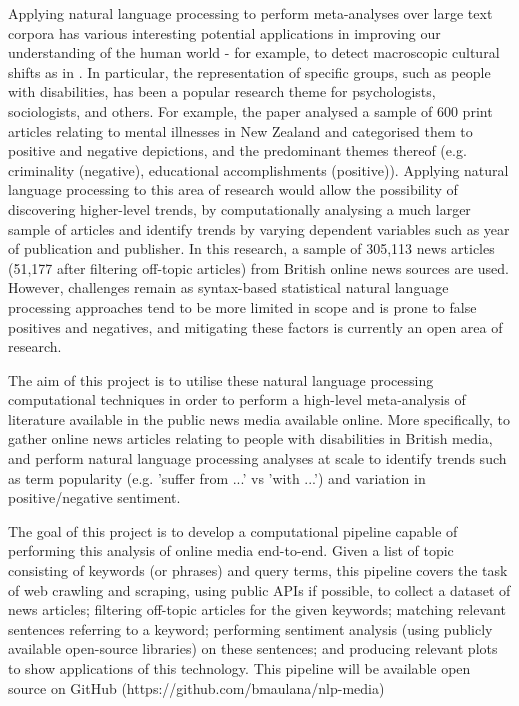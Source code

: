 \documentclass{report}
\begin{document}
Applying natural language processing to perform meta-analyses over large text corpora has various interesting potential applications in improving our understanding of the human world - for example, to detect macroscopic cultural shifts as in \cite{Content analysis of 150 years of British periodicals}.
In particular, the representation of specific groups, such as people with disabilities, has been a popular research theme for psychologists, sociologists, and others.
For example, the paper \cite{Depictions of Mental Illness in Print Media} analysed a sample of 600 print articles relating to mental illnesses in New Zealand and categorised them to positive and negative depictions, and the predominant themes thereof (e.g. criminality (negative), educational accomplishments (positive)).
Applying natural language processing to this area of research would allow the possibility of discovering higher-level trends, by computationally analysing a much larger sample of articles and identify trends by varying dependent variables such as year of publication and publisher.
In this research, a sample of 305,113 news articles (51,177 after filtering off-topic articles) from British online news sources are used.
However, challenges remain as syntax-based statistical natural language processing approaches tend to be more limited in scope and is prone to false positives and negatives, and mitigating these factors is currently an open area of research.

The aim of this project is to utilise these natural language processing computational techniques in order to perform a high-level meta-analysis of literature available in the public news media available online.
More specifically, to gather online news articles relating to people with disabilities in British media, and perform natural language processing analyses at scale to identify trends such as term popularity (e.g. 'suffer from ...' vs 'with ...') and variation in positive/negative sentiment.

The goal of this project is to develop a computational pipeline capable of performing this analysis of online media end-to-end.
Given a list of topic consisting of keywords (or phrases) and query terms, this pipeline covers the task of web crawling and scraping, using public APIs if possible, to collect a dataset of news articles; filtering off-topic articles for the given keywords; matching relevant sentences referring to a keyword; performing sentiment analysis (using publicly available open-source libraries) on these sentences; and producing relevant plots to show applications of this technology.
This pipeline will be available open source on GitHub (https://github.com/bmaulana/nlp-media)  %
\end{document}
